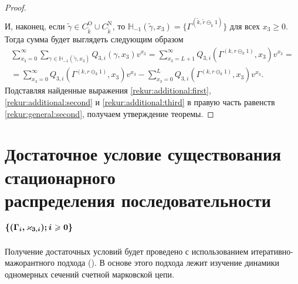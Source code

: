 \documentclass[a4paper,12pt,russian]{extarticle}
\newcommand{\MarkThree}{\{(\Gamma_i, \varkappa_{3,i}); \hm{} i \geqslant 0\}}
\begin{document}
\begin{proof}
\begin{multline}
\label{rekur:additional:second}
\end{multline}
И, наконец, если $\tilde{\gamma}\in C_{\tilde{k}}^{\mathrm{O}} \cup C_{\tilde{k}}^{\mathrm{N}}$, то ${\mathbb H}_{-1}(\tilde{\gamma},x_3) = \{\Gamma^{(\tilde{k},\tilde{r}\ominus_{\tilde{k}} 1)}\}$ для всех $x_3\geqslant 0$. Тогда сумма будет выглядеть следующим образом
\begin{multline}
\sum_{x_3=0}^{\infty} \sum_{\gamma \in {\mathbb H}_{-1}(\tilde{\gamma},x_3)} Q_{3,i}(\gamma,x_3) v^{x_3} = \sum_{x_3=L+1}^{\infty} Q_{3,i}(\Gamma^{(k,r\ominus_k 1)},x_3) v^{x_3} =\\=
\sum_{x_3=0}^{\infty} Q_{3,i}(\Gamma^{(k,r\ominus_k 1)},x_3) v^{x_3} - \sum_{x_3=0}^{L} Q_{3,i}(\Gamma^{(k,r\ominus_k 1)},x_3) v^{x_3}.
\label{rekur:additional:third}
\end{multline}
Подставляя найденные выражения \eqref{rekur:additional:first}, \eqref{rekur:additional:second} и \eqref{rekur:additional:third} в правую часть равенств \eqref{rekur:general:second}, получаем утверждение теоремы.
\end{proof}

\section[Достаточное условие существования стационарного\\ {распределения} последовательности $\boldsymbol{\MarkThree}$]%
{ Достаточное условие существования стационарного\\ {распределения} последовательности $\boldsymbol{\MarkThree}$}
Получение достаточных условий будет проведено с использованием итеративно-мажорантного подхода (\cite{Fedotkin:1988,Fedotkin:1989}). В основе этого подхода лежит изучение динамики одномерных сечений счетной марковской цепи. 
\end{document}
